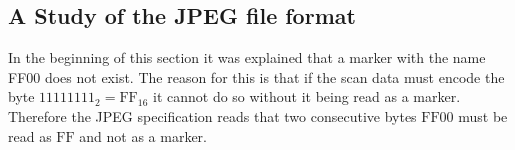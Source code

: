 \begin{infobox}{\section[A Study of the JPEG file format]{A Study of the JPEG file format}}
In the beginning of this section it was explained that a marker with the name FF00 does not exist. The reason for this is that if the scan data must encode the byte $1111 1111_2=\text{FF}_{16}$ it cannot do so without it being read as a marker. Therefore the JPEG specification reads that two consecutive bytes $\text{FF}00$ must be read as $\text{FF}$ and not as a marker. 

\end{infobox}